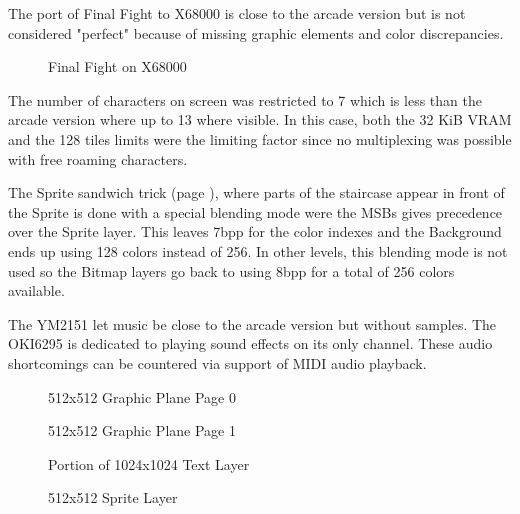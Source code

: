The port of Final Fight to X68000 is close to the arcade version but is not considered "perfect" because of missing graphic elements and color discrepancies. 


\begin{figure}[H]
\caption*{Final Fight on X68000}
\end{figure}

The number of characters on screen was restricted to 7 which is less than the arcade version where up to 13 where visible. In this case, both the 32 KiB VRAM and the 128 tiles limits were the limiting factor since no multiplexing was possible with free roaming characters.

The Sprite sandwich trick (page \pageref{finalfight_trick}), where parts of the staircase appear in front of the Sprite is done with a special blending mode were the MSBs gives precedence over the Sprite layer. This leaves 7bpp for the color indexes and the Background ends up using 128 colors instead of 256. In other levels, this blending mode is not used so the Bitmap layers go back to using 8bpp for a total of 256 colors available.

The YM2151 let music be close to the arcade version but without samples. The OKI6295 is dedicated to playing sound effects on its only channel. These audio shortcomings can be countered via support of MIDI audio playback.

\vspace{-4ex}
\begin{minipage}[t]{0.49\linewidth}
  \begin{figure}[H]
  \caption*{512x512 Graphic Plane Page 0}
  \end{figure}
\end{minipage}%
\hfill
\begin{minipage}[t]{0.49\linewidth}
  \begin{figure}[H]
  \caption*{512x512 Graphic Plane Page 1}
  \end{figure}
\end{minipage}%

\begin{minipage}[t]{0.49\linewidth}
  \begin{figure}[H]
  \caption*{Portion of 1024x1024 Text Layer}
  \end{figure}
\end{minipage}%
\hfill
\begin{minipage}[t]{0.49\linewidth}
   \begin{figure}[H]
  \caption*{512x512 Sprite Layer}
  \end{figure}
\end{minipage}%


